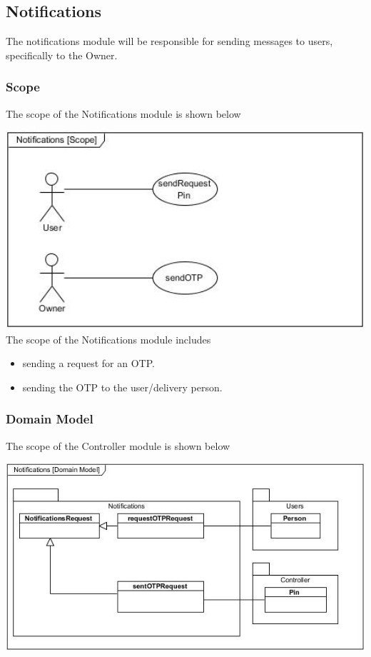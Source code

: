 \documentclass[a4paper,12pt]{article}
\begin{document}
	\newpage
	\subsection{Notifications}
	The notifications module will be responsible for sending messages to users, specifically to the Owner.
	
	\subsubsection{Scope}
	The scope of the Notifications module is shown below
	
	\includegraphics[width=1\textwidth]{./Pictures/UML/notificationsScope.jpg}\\[1.5cm]
	
	{\noindent}The scope of the Notifications module includes
	\begin{itemize}
		\item sending a request for an OTP.
		\item sending the OTP to the user/delivery person.
	\end{itemize}
	
	\newpage
	\subsubsection{Domain Model}
	
	The scope of the Controller module is shown below
	
	\includegraphics[width=1\textwidth]{./Pictures/UML/notificationsDomainModel.jpg}\\[1.5cm]
	
\end{document}
